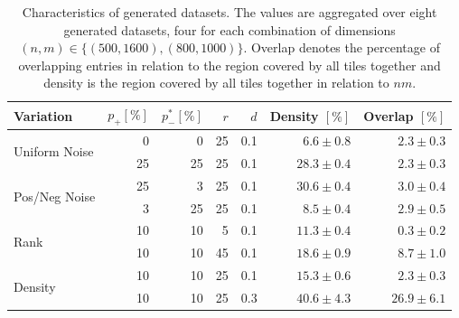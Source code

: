 \begin{table}%
	\centering
	\begin{tabular}{lrrrrrr}\toprule
Variation & $p_+[\%]$ & $p_-^*[\%]$ & $r$ & $d$ & Density $[\%]$ & Overlap $[\%]$ \\ \midrule
\multirow{2}{*}{Uniform Noise} &
0 & 0 & 25 & 0.1 & $6.6\pm0.8$ & $2.3\pm0.3$\\
& 25 & 25 & 25 & 0.1 & $28.3\pm0.4$ & $2.3\pm0.3$\\ \midrule
\multirow{2}{*}{Pos/Neg Noise} &25 & 3 & 25 & 0.1 & $30.6\pm0.4$ & $3.0\pm0.4$\\
 & 3 & 25 & 25 & 0.1 & $8.5\pm0.4$ & $2.9\pm0.5$\\ \midrule
\multirow{2}{*}{Rank} & 10 & 10 & 5 & 0.1 &  $11.3\pm0.4$ & $0.3\pm0.2$\\
 & 10 & 10 & 45 & 0.1 & $18.6\pm0.9$ & $8.7\pm1.0$\\ \midrule
\multirow{2}{*}{Density} & 10 & 10 & 25 & 0.1 & $15.3\pm0.6$ & $2.3\pm0.3$\\
 & 10 & 10 & 25 & 0.3 & $40.6\pm4.3$ & $26.9\pm6.1$\\\bottomrule
\end{tabular}
\caption{Characteristics of generated datasets. The values are aggregated over eight generated datasets, four for each combination of dimensions $(n,m)\in\{(500,1600),(800,1000)\}$. Overlap denotes the percentage of overlapping entries in relation to the region covered by all tiles together and density is the region covered by all tiles together in relation to $nm$.}\label{tbl:statSynthData}
\end{table}

